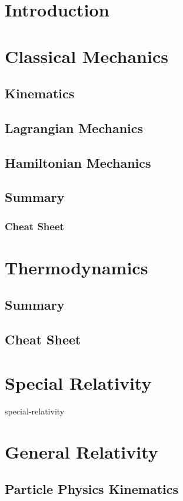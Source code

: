 \documentclass[12pt]{book}
\begin{document}
\chapter{Introduction}

\chapter{Classical Mechanics}
\section{Kinematics}
\section{Lagrangian Mechanics}
\section{Hamiltonian Mechanics}
\section{Summary}
\subsection{Cheat Sheet}

\chapter{Thermodynamics}
\section{Summary}
\section{Cheat Sheet}

\chapter{Special Relativity}
{special-relativity}

\chapter{General Relativity}
\section{Particle Physics Kinematics}
\end{document}
